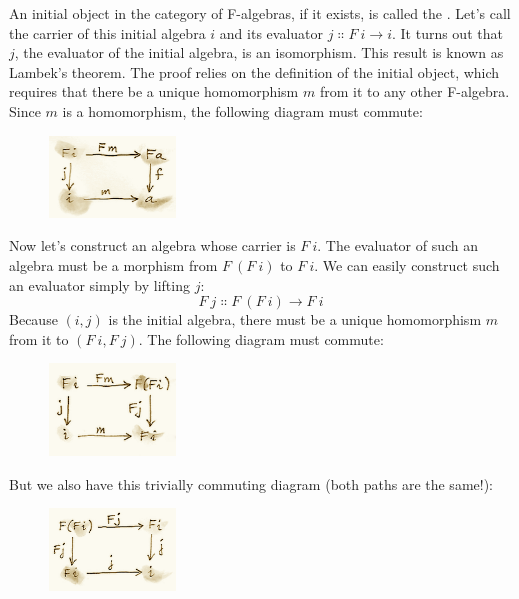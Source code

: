 An initial object in the category of F-algebras, if it exists, is called
the . Let's call the carrier of this initial
algebra $i$ and its evaluator $j \Colon F\ i \to i$. It turns out that $j$,
the evaluator of the initial algebra, is an isomorphism. This result is
known as Lambek's theorem. The proof relies on the definition of the
initial object, which requires that there be a unique homomorphism
$m$ from it to any other F-algebra. Since $m$ is a
homomorphism, the following diagram must commute:

\begin{figure}[H]
\centering
\includegraphics[width=0.3\textwidth]{images/alg2.png}
\end{figure}

\noindent
Now let's construct an algebra whose carrier is $F\ i$. The
evaluator of such an algebra must be a morphism from $F\ (F\ i)$
to $F\ i$. We can easily construct such an evaluator simply by
lifting $j$:
\[F\ j \Colon F\ (F\ i) \to F\ i\]
Because $(i, j)$ is the initial algebra, there must be a unique
homomorphism $m$ from it to $(F\ i, F\ j)$. The following
diagram must commute:

\begin{figure}[H]
\centering
\includegraphics[width=0.3\textwidth]{images/alg3a.png}
\end{figure}

\noindent
But we also have this trivially commuting diagram (both paths are the
same!):

\begin{figure}[H]
\centering
\includegraphics[width=0.3\textwidth]{images/alg3.png}
\end{figure}


